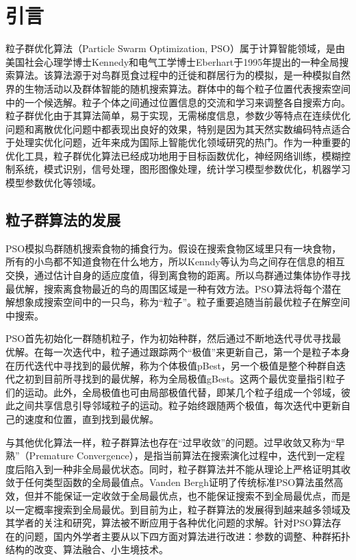 

\section{引言}
粒子群优化算法（Particle Swarm Optimization, PSO）属于计算智能领域，是由美国社会心理学博士Kennedy和电气工学博士Eberhart于1995年提出的一种全局搜索算法\cite{Eberhart2002A}\cite{Eberhart2002Particle}。该算法源于对鸟群觅食过程中的迁徙和群居行为的模拟，是一种模拟自然界的生物活动以及群体智能的随机搜索算法。群体中的每个粒子位置代表搜索空间中的一个候选解。粒子个体之间通过位置信息的交流和学习来调整各自搜索方向。粒子群优化由于其算法简单，易于实现，无需梯度信息，参数少等特点在连续优化问题和离散优化问题中都表现出良好的效果，特别是因为其天然实数编码特点适合于处理实优化问题，近年来成为国际上智能优化领域研究的热门。作为一种重要的优化工具，粒子群优化算法已经成功地用于目标函数优化，神经网络训练，模糊控制系统，模式识别，信号处理，图形图像处理，统计学习模型参数优化，机器学习模型参数优化等领域。

\subsection{粒子群算法的发展}
PSO模拟鸟群随机搜索食物的捕食行为。假设在搜索食物区域里只有一块食物，所有的小鸟都不知道食物在什么地方，所以Kenndy等认为鸟之间存在信息的相互交换，通过估计自身的适应度值，得到离食物的距离。所以鸟群通过集体协作寻找最优解，搜索离食物最近的鸟的周围区域是一种有效方法。PSO算法将每个潜在解想象成搜索空间中的一只鸟，称为“粒子”。粒子重要追随当前最优粒子在解空间中搜索。

PSO首先初始化一群随机粒子，作为初始种群，然后通过不断地迭代寻优寻找最优解。在每一次迭代中，粒子通过跟踪两个“极值”来更新自己，第一个是粒子本身在历代迭代中寻找到的最优解，称为个体极值pBest，另一个极值是整个种群自迭代之初到目前所寻找到的最优解，称为全局极值gBest。这两个最优变量指引粒子们的运动。此外，全局极值也可由局部极值代替，即某几个粒子组成一个邻域，彼此之间共享信息引导邻域粒子的运动。粒子始终跟随两个极值，每次迭代中更新自己的速度和位置，直到找到最优解。

与其他优化算法一样，粒子群算法也存在“过早收敛”的问题。过早收敛又称为“早熟”（Premature Convergence），是指当前算法在搜索演化过程中，迭代到一定程度后陷入到一种非全局最优状态。同时，粒子群算法并不能从理论上严格证明其收敛于任何类型函数的全局最值点。Vanden Bergh证明了传统标准PSO算法虽然高效，但并不能保证一定收敛于全局最优点，也不能保证搜索不到全局最优点，而是以一定概率搜索到全局最优。到目前为止，粒子群算法的发展得到越来越多领域及其学者的关注和研究，算法被不断应用于各种优化问题的求解。针对PSO算法存在的问题，国内外学者主要从以下四方面对算法进行改进：参数的调整、种群拓扑结构的改变、算法融合、小生境技术。

